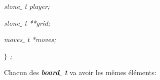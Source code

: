 \documentclass[a4paper,12pt]{article}
\begin{document}
\noindent \begin{justify}
\hspace*{0.49in}\hspace*{0.49in}\hspace*{0.49in}\hspace*{0.49in}\hspace*{0.49in}\textit{stone$ \_ $ t player;}
\end{justify}\par


\noindent \begin{justify}
\hspace*{0.49in}\hspace*{0.49in}\hspace*{0.49in}\hspace*{0.49in}\hspace*{0.49in}\textit{stone$ \_ $ t **grid;}
\end{justify}\par


\noindent \begin{justify}
\hspace*{0.49in}\hspace*{0.49in}\hspace*{0.49in}\hspace*{0.49in}\hspace*{0.49in}\textit{moves$ \_ $ t *moves;}
\end{justify}\par


\noindent \begin{justify}
\hspace*{0.49in}\hspace*{0.49in}\hspace*{0.49in}\textit{\hspace*{0.49in}$ \} $ ;}
\end{justify}\par


\noindent \begin{justify}
Chacun des \textbf{\textit{board$ \_ $ t}} va avoir les mêmes éléments:
\end{justify}\par
\end{document}

